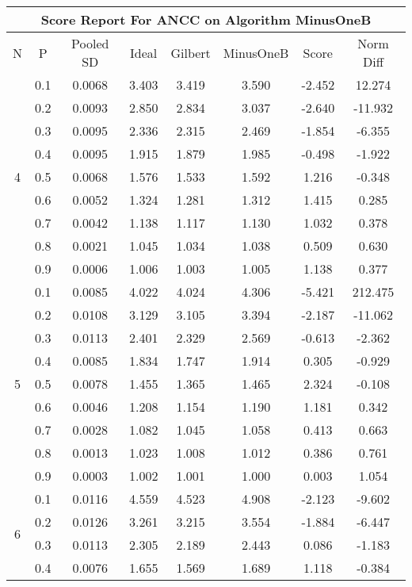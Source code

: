 \documentclass[11pt,a4paper]{report}
\begin{document}
\begin{longtable}{ | c | c || c | c | c | c | c | c | }
\hline
\multicolumn{8}{|c|}{ Score Report For ANCC on Algorithm MinusOneB} \\
\hline
N & P & Pooled SD &  Ideal &  Gilbert & MinusOneB  & Score & Norm Diff \\
 \hline
 \hline
 \endhead
\multirow{9}{*}{4} & 0.1 & 0.0068 & 3.403 & 3.419 & 3.590 & -2.452 & 12.274 \\
 & 0.2 & 0.0093 & 2.850 & 2.834 & 3.037 & -2.640 & -11.932 \\
 & 0.3 & 0.0095 & 2.336 & 2.315 & 2.469 & -1.854 & -6.355 \\
 & 0.4 & 0.0095 & 1.915 & 1.879 & 1.985 & -0.498 & -1.922 \\
 & 0.5 & 0.0068 & 1.576 & 1.533 & 1.592 & 1.216 & -0.348 \\
 & 0.6 & 0.0052 & 1.324 & 1.281 & 1.312 & 1.415 & 0.285 \\
 & 0.7 & 0.0042 & 1.138 & 1.117 & 1.130 & 1.032 & 0.378 \\
 & 0.8 & 0.0021 & 1.045 & 1.034 & 1.038 & 0.509 & 0.630 \\
 & 0.9 & 0.0006 & 1.006 & 1.003 & 1.005 & 1.138 & 0.377 \\
 \hline
\multirow{9}{*}{5} & 0.1 & 0.0085 & 4.022 & 4.024 & 4.306 & -5.421 & 212.475 \\
 & 0.2 & 0.0108 & 3.129 & 3.105 & 3.394 & -2.187 & -11.062 \\
 & 0.3 & 0.0113 & 2.401 & 2.329 & 2.569 & -0.613 & -2.362 \\
 & 0.4 & 0.0085 & 1.834 & 1.747 & 1.914 & 0.305 & -0.929 \\
 & 0.5 & 0.0078 & 1.455 & 1.365 & 1.465 & 2.324 & -0.108 \\
 & 0.6 & 0.0046 & 1.208 & 1.154 & 1.190 & 1.181 & 0.342 \\
 & 0.7 & 0.0028 & 1.082 & 1.045 & 1.058 & 0.413 & 0.663 \\
 & 0.8 & 0.0013 & 1.023 & 1.008 & 1.012 & 0.386 & 0.761 \\
 & 0.9 & 0.0003 & 1.002 & 1.001 & 1.000 & 0.003 & 1.054 \\
 \hline
\multirow{9}{*}{6} & 0.1 & 0.0116 & 4.559 & 4.523 & 4.908 & -2.123 & -9.602 \\
 & 0.2 & 0.0126 & 3.261 & 3.215 & 3.554 & -1.884 & -6.447 \\
 & 0.3 & 0.0113 & 2.305 & 2.189 & 2.443 & 0.086 & -1.183 \\
 & 0.4 & 0.0076 & 1.655 & 1.569 & 1.689 & 1.118 & -0.384 \\

\end{longtable}
\end{document}
